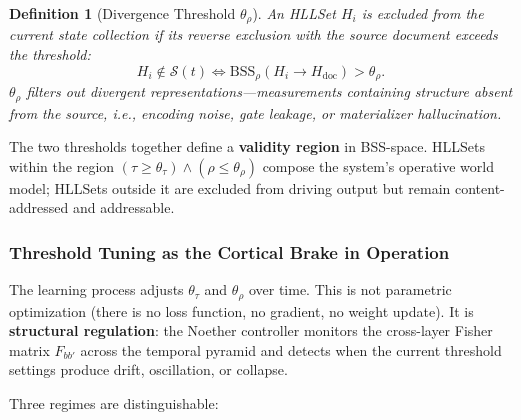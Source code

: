 \documentclass[11pt,a4paper]{article}
\newtheorem{definition}{Definition}[section]
\theoremstyle{remark}
\begin{document}
\begin{definition}[Divergence Threshold $\theta_{\rho}$]
An HLLSet $H_i$ is excluded from the current state collection if its reverse
exclusion with the source document exceeds the threshold:
\begin{equation}
  H_i \notin \mathcal{S}(t) \iff \text{BSS}_{\rho}(H_i \to
  H_{\text{doc}}) > \theta_{\rho}.
\end{equation}
$\theta_{\rho}$ filters out divergent representations---measurements
containing structure absent from the source, i.e., encoding noise, gate
leakage, or materializer hallucination.
\end{definition}

The two thresholds together define a \textbf{validity region} in
BSS-space. HLLSets within the region $(\tau \geq \theta_{\tau}) \land
(\rho \leq \theta_{\rho})$ compose the system's operative world model;
HLLSets outside it are excluded from driving output but remain
content-addressed and addressable.

\subsubsection{Threshold Tuning as the Cortical Brake in Operation}

The learning process adjusts $\theta_{\tau}$ and $\theta_{\rho}$ over
time. This is not parametric optimization (there is no loss function, no
gradient, no weight update). It is \textbf{structural regulation}: the
Noether controller monitors the cross-layer Fisher matrix
$F_{bb'}$ across the temporal pyramid and detects when the current threshold
settings produce drift, oscillation, or collapse.

Three regimes are distinguishable:
\end{document}
